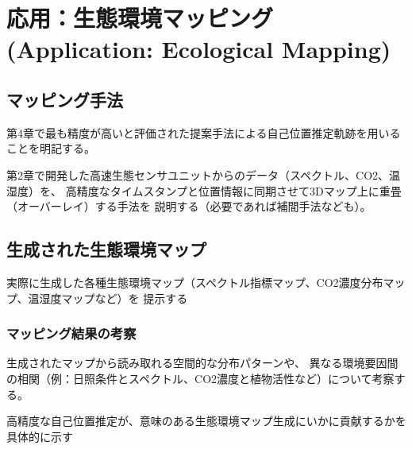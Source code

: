 \documentclass[main]{subfiles}
\begin{document}
\chapter{応用：生態環境マッピング (Application: Ecological Mapping)}

\section{マッピング手法}
第4章で最も精度が高いと評価された提案手法による自己位置推定軌跡を用いることを明記する。

第2章で開発した高速生態センサユニットからのデータ（スペクトル、CO2、温湿度）を、
高精度なタイムスタンプと位置情報に同期させて3Dマップ上に重畳（オーバーレイ）する手法を
説明する（必要であれば補間手法なども）。

\section{生成された生態環境マップ}
実際に生成した各種生態環境マップ（スペクトル指標マップ、CO2濃度分布マップ、温湿度マップなど）を
提示する

\subsection{マッピング結果の考察} 
生成されたマップから読み取れる空間的な分布パターンや、
異なる環境要因間の相関（例：日照条件とスペクトル、CO2濃度と植物活性など）について考察する。

高精度な自己位置推定が、意味のある生態環境マップ生成にいかに貢献するかを具体的に示す
\end{document}
